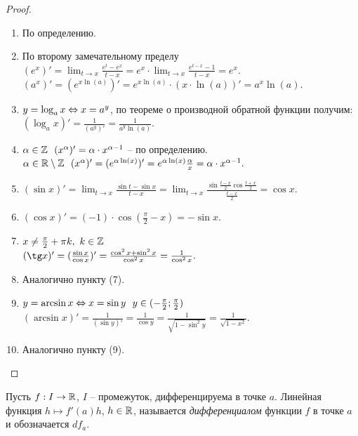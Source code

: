     \begin{proof}
        \begin{enumerate}
            \item По определению.
            \item По второму замечательному пределу $(e^{x})' = \lim_{t \to x} \frac{e^{t} - e^{x}}{t - x} = e^{x} \cdot \lim_{t \to x} \frac{e^{t - x} - 1}{t - x} = e^{x}.$\\
            $(a^{x})' = (e^{x \ln(a)})' = e^{x \ln(a)} \cdot (x \cdot \ln(a))' = a^{x} \ln(a).$
            \item $y = \log_{a}x \Leftrightarrow x = a^{y}$, по теореме о производной обратной функции получим: $(\log_{a}x)' = \frac{1}{(a^{y})'} = \frac{1}{a^{y} \ln(a)}.$
            \item $\alpha \in \mathbb{Z} \ \ (x^{\alpha})' = \alpha \cdot x^{\alpha - 1}$ -- по определению. \\
            $\alpha \in \mathbb{R} \setminus \mathbb{Z} \ \ (x^{\alpha})' = (e^{\alpha \ln(x)})' = e^{\alpha \ln(x)} \frac{\alpha}{x} = \alpha \cdot x^{\alpha - 1}.$
            \item $(\sin x)' = \lim_{t \to x} \frac{\sin t - \sin x}{t - x} = \lim_{t \to x} \frac{\sin \frac{t - x}{2} \cos \frac{t + x}{2}}{\frac{t - x}{2}} = \cos x.$
            \item $(\cos x)' = (-1)\cdot \cos (\frac{\pi}{2} - x) = - \sin x.$
            \item $x \neq \frac{\pi}{2} + \pi k, \ k \in \mathbb{Z}$\\
            $(\tg x)' = (\frac{\sin x}{\cos x})' = \frac{\cos^{2}x + \sin^{2}x}{\cos^{2}x} = \frac{1}{\cos^{2}x}.$
            \item Аналогично пункту (7).
            \item $y = \arcsin x \Leftrightarrow x = \sin y \ \ y \in (-\frac{\pi}{2};\frac{\pi}{2})$\\
            $(\arcsin x)' = \frac{1}{(\sin y)'} = \frac{1}{\cos y} = \frac{1}{\sqrt{1 - \sin^{2}y}} = \frac{1}{\sqrt{1 - x^{2}}}.$
            \item Аналогично пункту (9).
        \end{enumerate}
    \end{proof}
    
    \begin{definition}
        Пусть $f: I \to \mathbb{R}$, $I$ -- промежуток, дифференцируема в точке $a$. Линейная функция $h \mapsto f'(a)h$, $h \in \mathbb{R}$, называется \textit{дифференциалом} функции $f$ в точке $a$ и обозначается $df_{a}$.
    \end{definition}
    
